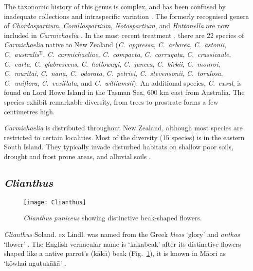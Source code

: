 The taxonomic history of this genus is complex, and has been
confused by inadequate collections and intraspecific variation
\citep{Heenan95b}. The formerly recognised genera of
\emph{Chordospartium}, \emph{Corallospartium}, \emph{Notospartium},
and \emph{Huttonella} are now included in \emph{Carmichaelia}
\citep{Heenan95a,Heenan98c,Heenan98a}. In the most recent treatment
\citep{Heenan95b,Heenan96b}, there are 22 species of
\emph{Carmichaelia} native to New Zealand (\emph{C.~appressa},
\emph{C.~arborea}, \emph{C.~astonii},
\emph{C.~australis}$^{\mathrm{T}}$, \emph{C.~carmichaeliae},
\emph{C.~compacta}, \emph{C.~corrugata}, \emph{C.~crassicaule},
\emph{C.~curta}, \emph{C.~glabrescens}, \emph{C.~hollowayi},
\emph{C.~juncea}, \emph{C.~kirkii}, \emph{C.~monroi},
\emph{C.~muritai}, \emph{C.~nana}, \emph{C.~odorata},
\emph{C.~petriei}, \emph{C.~stevensonii}, \emph{C.~torulosa},
\emph{C.~uniflora}, \emph{C.~vexillata}, and \emph{C.~williamsii}).
An additional species, \emph{C.~exsul}, is found on Lord Howe Island
in the Tasman Sea, 600 km east from Australia. The species exhibit
remarkable diversity, from trees to prostrate forms a few
centimetres high.

\emph{Carmichaelia} is distributed throughout New Zealand, although
most species are restricted to certain localities. Most of the
diversity (15 species) is in the eastern South Island. They
typically invade disturbed habitats on shallow poor soils, drought
and frost prone areas, and alluvial soils \citep{Wagstaff99}.

\subsection{\emph{Clianthus}}

\begin{figure} [tb]
    \centering
    \texttt{[image: Clianthus]}
    \caption[\emph{Clianthus puniceus}]{\emph{Clianthus puniceus}
     showing distinctive beak-shaped flowers.}
    \label{p-Clianthus}
\end{figure}


\emph{Clianthus} Soland. ex Lindl. was named from the Greek
\emph{kleos} `glory' and \emph{anthos} `flower' \citep{Allen81}. The
English vernacular name is `kakabeak' after its distinctive flowers
shaped like a native parrot's (k\=ak\=a) beak
(Fig.~\ref{p-Clianthus}), it is known in M\=aori as `k\=owhai
ngutuk\=ak\=a' \citep{Shaw97}.

